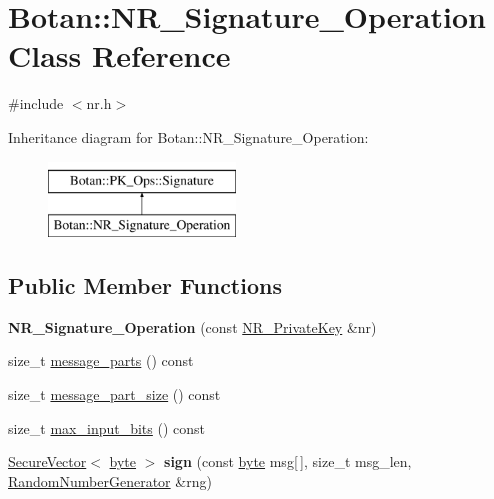 \hypertarget{classBotan_1_1NR__Signature__Operation}{\section{Botan\-:\-:N\-R\-\_\-\-Signature\-\_\-\-Operation Class Reference}
\label{classBotan_1_1NR__Signature__Operation}
}


{\ttfamily \#include $<$nr.\-h$>$}

Inheritance diagram for Botan\-:\-:N\-R\-\_\-\-Signature\-\_\-\-Operation\-:\begin{figure}[H]
\begin{center}
\leavevmode
\includegraphics[height=2.000000cm]{classBotan_1_1NR__Signature__Operation}
\end{center}
\end{figure}
\subsection*{Public Member Functions}
\begin{DoxyCompactItemize}
\item 
\hypertarget{classBotan_1_1NR__Signature__Operation_a2222622797f96a0dbb5fb76fc05de817}{{\bfseries N\-R\-\_\-\-Signature\-\_\-\-Operation} (const \hyperlink{classBotan_1_1NR__PrivateKey}{N\-R\-\_\-\-Private\-Key} \&nr)}\label{classBotan_1_1NR__Signature__Operation_a2222622797f96a0dbb5fb76fc05de817}

\item 
size\-\_\-t \hyperlink{classBotan_1_1NR__Signature__Operation_a0915f24c8cf69f453a71326dddd5b1b9}{message\-\_\-parts} () const 
\item 
size\-\_\-t \hyperlink{classBotan_1_1NR__Signature__Operation_a8aecd35f1ce74189633d4864c3734fce}{message\-\_\-part\-\_\-size} () const 
\item 
size\-\_\-t \hyperlink{classBotan_1_1NR__Signature__Operation_a5e7988f56d218936737254d28446b6f0}{max\-\_\-input\-\_\-bits} () const 
\item 
\hypertarget{classBotan_1_1NR__Signature__Operation_aa49e31218799e0148a3cfeea678295ae}{\hyperlink{classBotan_1_1SecureVector}{Secure\-Vector}$<$ \hyperlink{namespaceBotan_a7d793989d801281df48c6b19616b8b84}{byte} $>$ {\bfseries sign} (const \hyperlink{namespaceBotan_a7d793989d801281df48c6b19616b8b84}{byte} msg\mbox{[}$\,$\mbox{]}, size\-\_\-t msg\-\_\-len, \hyperlink{classBotan_1_1RandomNumberGenerator}{Random\-Number\-Generator} \&rng)}\label{classBotan_1_1NR__Signature__Operation_aa49e31218799e0148a3cfeea678295ae}

\end{DoxyCompactItemize}


